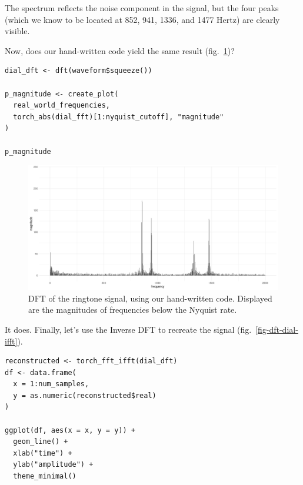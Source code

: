 \documentclass[
  letterpaper,
]{krantz}
\begin{document}
The spectrum reflects the noise component in the signal, but the four
peaks (which we know to be located at 852, 941, 1336, and 1477 Hertz)
are clearly visible.

Now, does our hand-written code yield the same result
(fig.~\ref{fig-dft-dial-dft})?

\begin{verbatim}
dial_dft <- dft(waveform$squeeze())

p_magnitude <- create_plot(
  real_world_frequencies,
  torch_abs(dial_fft)[1:nyquist_cutoff], "magnitude"
)

p_magnitude
\end{verbatim}

\begin{figure}[H]

{\centering \includegraphics{images/dft-dial-dft.png}

}

\caption{\label{fig-dft-dial-dft}DFT of the ringtone signal, using our
hand-written code. Displayed are the magnitudes of frequencies below the
Nyquist rate.}

\end{figure}

It does. Finally, let's use the Inverse DFT to recreate the signal
(fig.~\ref{fig-dft-dial-ifft}).

\begin{verbatim}
reconstructed <- torch_fft_ifft(dial_dft)
df <- data.frame(
  x = 1:num_samples,
  y = as.numeric(reconstructed$real)
)

ggplot(df, aes(x = x, y = y)) +
  geom_line() +
  xlab("time") +
  ylab("amplitude") +
  theme_minimal()
\end{verbatim}
\end{document}
